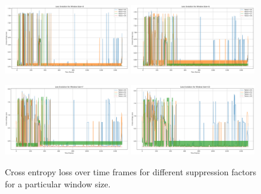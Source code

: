 \documentclass[../report.tex]{subfiles}
\begin{document}
   

    \begin{figure}[p]
        \centering
        \includegraphics[width=0.48\textwidth]{figures/seq_len_3_comparison.png}
        \includegraphics[width=0.48\textwidth]{figures/seq_len_5_comparison.png}
        
        \vspace{1em}
        
        \includegraphics[width=0.48\textwidth]{figures/seq_len_7_comparison.png}
        \includegraphics[width=0.48\textwidth]{figures/seq_len_10_comparison.png}
        
        \caption{Cross entropy loss over time frames for different suppression factors for a particular window size.}
        \label{fig:sequence_plots}
    \end{figure}
\end{document}
